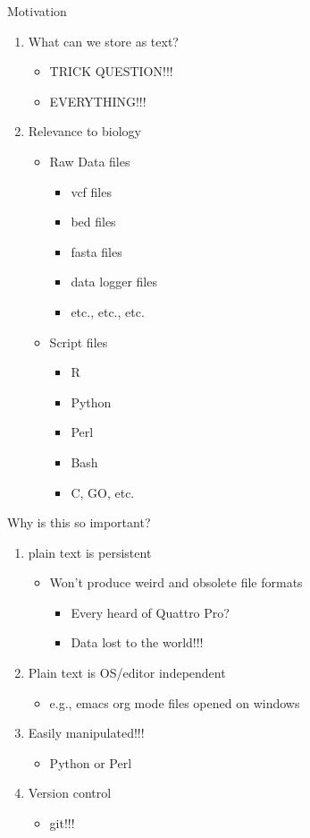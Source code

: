 \documentclass[t,10pt]{beamer}
\begin{document}
\begin{frame}[label={sec:orgheadline2}]{Motivation}
\begin{enumerate}[<+->]
\item What can we store as text?
\begin{itemize}
\item TRICK QUESTION!!!
\item EVERYTHING!!!
\end{itemize}
\item Relevance to biology
\begin{itemize}
\item Raw Data files
\begin{itemize}
\item vcf files
\item bed files
\item fasta files
\item data logger files
\item etc., etc., etc.
\end{itemize}
\item Script files
\begin{itemize}
\item R
\item Python
\item Perl
\item Bash
\item C, GO, etc.
\end{itemize}
\end{itemize}
\end{enumerate}
\end{frame}
\begin{frame}[label={sec:orgheadline3}]{Why is this so important?}
\begin{enumerate}[<+->]
\item plain text is persistent
\begin{itemize}
\item Won't produce weird and obsolete file formats
\begin{itemize}
\item Every heard of Quattro Pro?
\item Data lost to the world!!!
\end{itemize}
\end{itemize}
\item Plain text is OS/editor independent
\begin{itemize}
\item e.g., emacs org mode files opened on windows
\end{itemize}
\item Easily manipulated!!!
\begin{itemize}
\item Python or Perl
\end{itemize}
\item Version control 
\begin{itemize}
\item git!!!
\end{itemize}
\end{enumerate}
\end{frame}
\end{document}
